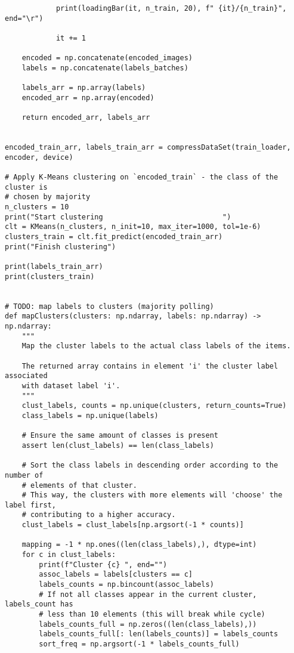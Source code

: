 \documentclass[12pt]{article}
\begin{document}
\begin{verbatim}
            print(loadingBar(it, n_train, 20), f" {it}/{n_train}", end="\r")

            it += 1

    encoded = np.concatenate(encoded_images)
    labels = np.concatenate(labels_batches)

    labels_arr = np.array(labels)
    encoded_arr = np.array(encoded)

    return encoded_arr, labels_arr


encoded_train_arr, labels_train_arr = compressDataSet(train_loader, encoder, device)

# Apply K-Means clustering on `encoded_train` - the class of the cluster is
# chosen by majority
n_clusters = 10
print("Start clustering                            ")
clt = KMeans(n_clusters, n_init=10, max_iter=1000, tol=1e-6)
clusters_train = clt.fit_predict(encoded_train_arr)
print("Finish clustering")

print(labels_train_arr)
print(clusters_train)


# TODO: map labels to clusters (majority polling)
def mapClusters(clusters: np.ndarray, labels: np.ndarray) -> np.ndarray:
    """
    Map the cluster labels to the actual class labels of the items.

    The returned array contains in element 'i' the cluster label associated
    with dataset label 'i'.
    """
    clust_labels, counts = np.unique(clusters, return_counts=True)
    class_labels = np.unique(labels)

    # Ensure the same amount of classes is present
    assert len(clust_labels) == len(class_labels)

    # Sort the class labels in descending order according to the number of
    # elements of that cluster.
    # This way, the clusters with more elements will 'choose' the label first,
    # contributing to a higher accuracy.
    clust_labels = clust_labels[np.argsort(-1 * counts)]

    mapping = -1 * np.ones((len(class_labels),), dtype=int)
    for c in clust_labels:
        print(f"Cluster {c} ", end="")
        assoc_labels = labels[clusters == c]
        labels_counts = np.bincount(assoc_labels)
        # If not all classes appear in the current cluster, labels_count has
        # less than 10 elements (this will break while cycle)
        labels_counts_full = np.zeros((len(class_labels),))
        labels_counts_full[: len(labels_counts)] = labels_counts
        sort_freq = np.argsort(-1 * labels_counts_full)


\end{verbatim}
\end{document}
